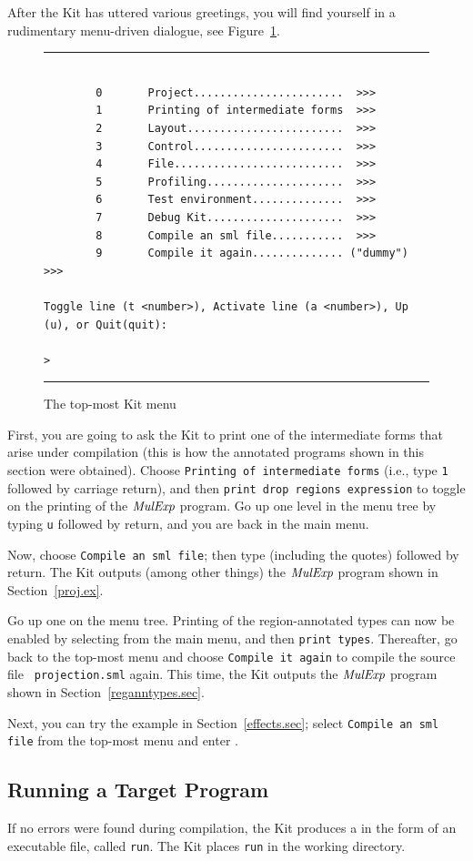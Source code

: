 \documentclass[12pt]{book}
\begin{document}
After the Kit has uttered various greetings, you will find yourself in
a rudimentary menu-driven dialogue, see Figure~\ref{dialogue.fig}.
\begin{figure}
\hrule
\begin{verbatim}

        0       Project.......................  >>>
        1       Printing of intermediate forms  >>>
        2       Layout........................  >>>
        3       Control.......................  >>>
        4       File..........................  >>>
        5       Profiling.....................  >>>
        6       Test environment..............  >>>
        7       Debug Kit.....................  >>>
        8       Compile an sml file...........  >>>
        9       Compile it again.............. ("dummy") >>>

Toggle line (t <number>), Activate line (a <number>), Up (u), or Quit(quit): 

>
\end{verbatim}
\caption{The top-most Kit menu}
\hrule
\label{dialogue.fig}
\end{figure}
First, you are going to ask the Kit to print one of the intermediate
forms that arise under compilation (this is how the annotated programs
shown in this section were obtained). 
Choose \texttt{Printing of intermediate forms} (i.e., type \texttt{1}
followed by carriage return), and then \texttt{print drop regions
expression} to toggle on the printing of the $\hbox{\it MulExp}$ program.
Go up one level in the menu tree by typing \texttt{u} followed by return,
and you are back in the main menu.

Now, choose \texttt{Compile an sml file}; then type
 (including the quotes) followed by return.
The Kit outputs (among other things) the $\hbox{\it MulExp}$ program shown in
Section~\ref{proj.ex}.

Go up one on the menu tree.  Printing of the region-annotated types
can now be enabled by selecting  from the main menu, and
then \texttt{print types}.  Thereafter, go back to the top-most menu
and choose \texttt{Compile it again} to compile the source file {\tt
  projection.sml} again. This time, the Kit outputs the $\hbox{\it MulExp}$
program shown in Section~\ref{reganntypes.sec}.

Next, you can try the example in Section~\ref{effects.sec}; select
\texttt{Compile an sml file} from the top-most menu and enter
.


\subsection{Running a Target Program}
If no errors were found during compilation, the Kit produces a
 in the form of an
executable file, called {\tt run}. The Kit places {\tt run} in the
working directory.
\end{document}
